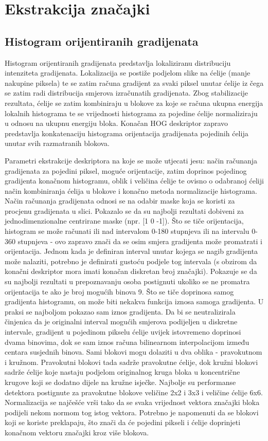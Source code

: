 \documentclass[times, utf8, seminar, numeric]{fer}
\begin{document}
\section{Ekstrakcija značajki}
\subsection{Histogram orijentiranih gradijenata}
Histogram orijentiranih gradijenata predstavlja lokaliziranu distribuciju intenziteta gradijenata. Lokalizacija se postiže podjelom slike na ćelije (manje nakupine piksela) te se zatim računa gradijent za svaki piksel unutar ćelije iz čega se zatim radi distribucija smjerova izračunatih gradijenata. Zbog stabilizacije rezultata, ćelije se zatim kombiniraju u blokove za koje se računa ukupna energija lokalnih histograma te se vrijednosti histograma za pojedine ćelije normaliziraju u odnosu na ukupnu energiju bloka. Konačan HOG deskriptor zapravo predstavlja konkatenaciju histograma orijentacija gradijenata pojedinih ćelija unutar svih razmatranih blokova.

Parametri ekstrakcije deskriptora na koje se može utjecati jesu: način računanja gradijenata za pojedini piksel, moguće orijentacije, zatim doprinos pojedinog gradijenta konačnom histogramu, oblik i veličina ćelije te ovisno o odabranoj ćeliji način kombiniranja ćelija u blokove i konačno metoda normalizacije histograma. Način računanja gradijenata odnosi se na odabir maske koja se koristi  za procjenu gradijenata u slici. Pokazalo se da su najbolji rezultati dobiveni za jednodimenzionalne centrirane maske (npr. [1 0 -1]). Što se tiče orijentacija, histogram se može računati ili nad intervalom 0-180  stupnjeva ili na intervalu 0-360 stupnjeva - ovo zapravo znači da se osim smjera gradijenta može promatrati i orijentacija. Jednom kada je definiran interval unutar kojega se nagib gradijenta može nalaziti, potrebno je definirati gustoću podjele tog intervala (s obzirom da konačni deskriptor mora imati konačan diskretan broj značajki). Pokazuje se da su najbolji rezultati u prepoznavanju osoba postignuti ukoliko se ne promatra orijentacija te ako je broj mogućih binova 9. Što se tiče doprinosa samog gradijenta histogramu, on može biti nekakva funkcija iznosa samoga gradijenta. U praksi se najboljom pokazao sam iznos gradijenta. Da bi se neutralizirala činjenica da je originalni interval mogućih smjerova podijeljen u diskretne intervale, gradijent u pojedinom pikselu ćelije uvijek istovremeno doprinosi dvama binovima, dok se sam iznos računa bilinearnom interpolacijom između centara susjednih binova. Sami blokovi mogu dolaziti u dva oblika - pravokutnom i kružnom. Pravokutni blokovi tada sadrže pravokutne ćelije, dok kružni blokovi sadrže ćelije koje nastaju podjelom originalnog kruga bloka u koncentrične krugove koji se dodatno dijele na kružne isječke. Najbolje su performanse detektora postignute za pravokutne blokove veličine 2x2 i 3x3 i veličine ćelije 6x6. Normalizacija se najčešće vrši tako da se svaka vrijednost vektora značajki bloka podijeli nekom normom tog istog vektora.  Potrebno je napomenuti da se blokovi koji se koriste preklapaju, što znači da će pojedini pikseli i ćelije doprinjeti konačnom vektoru značajki kroz više blokova.
\end{document}
